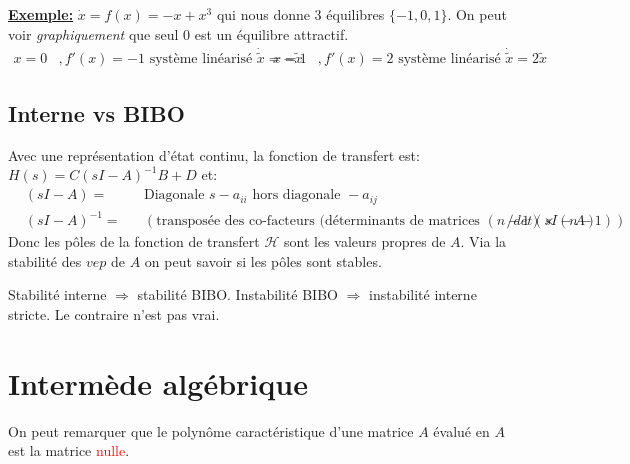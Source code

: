 \documentclass{report}
\begin{document}
\underline{\textbf{Exemple:}} $\dot{x} = f(x) = -x +x^3$ qui nous donne 3 équilibres $\{-1, 0, 1\}$. On peut voir \textit{graphiquement} que seul 0 est un équilibre attractif.
\begin{align*}
x = 0 &, f'(x) = -1 \text{ système linéarisé } \dot{\tilde{x}} = - \tilde{x} & x = 1 &, f'(x) = 2 \text{ système linéarisé } \dot{\tilde{x}} = 2 \tilde{x} 
\end{align*}

\subsection{Interne vs BIBO}
Avec une représentation d'état continu, la fonction de transfert est: $H(s) = C(sI - A)^{-1} B + D$ et:
\begin{align*}
&(sI-A)= & &\text{Diagonale } s-a_{ii} \text{ hors diagonale } -a_{ij}\\
&(sI-A)^{-1}= & & (\text{transposée des co-facteurs (déterminants de matrices }(n-1)\times (n-1))/ det(sI-A)
\end{align*}
Donc les pôles de la fonction de transfert $\mathcal{H}$ sont les valeurs propres de $A$. Via la stabilité des $vep$ de $A$ on peut savoir si les pôles sont stables.\par 
Stabilité interne $\Longrightarrow$ stabilité BIBO. Instabilité BIBO $\Longrightarrow$ instabilité interne stricte. Le contraire n'est pas vrai.\par

\section{Intermède algébrique} 
On peut remarquer que le polynôme caractéristique d'une matrice $A$ évalué en $A$ est la matrice \textcolor{red}{nulle}.
\end{document}
